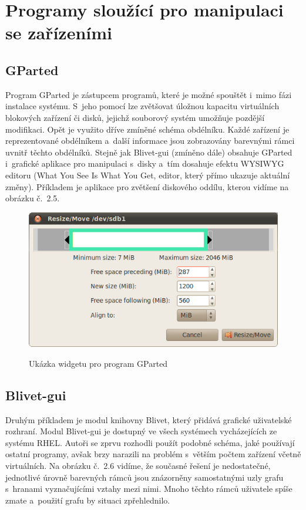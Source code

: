 \documentclass[printed,color,table,oneside,nolot,nolof]{fithesis}
\begin{document}
\pagebreak
\section{Programy sloužící pro manipulaci se zařízeními}

\subsection{GParted}
	Program GParted\cite{GParted} je zástupcem programů, které je možné spouštět i~mimo fázi instalace systému. S~jeho pomocí lze 
	zvětšovat úložnou kapacitu virtuálních blokových zařízení či disků, jejichž souborový systém umožňuje pozdější modifikaci. Opět je využito dříve zmíněné schéma obdélníku. Každé zařízení je reprezentované
	obdélníkem a~další informace jsou zobrazovány barevnými rámci uvnitř těchto obdélníků. Stejně jak Blivet-gui (zmíněno dále) obsahuje GParted i~grafické aplikace pro manipulaci s~disky 
	a~tím dosahuje efektu WYSIWYG editoru (What You See Is What You Get, editor, který přímo ukazuje aktuální změny). Příkladem je aplikace pro zvětšení diskového oddílu, kterou vidíme na obrázku č.~2.5.

 \begin{figure}[h!]
	 \label{fig:gparted}
	 \caption{Ukázka widgetu pro program GParted~\cite{GParted}}
	 \centering
	 \includegraphics[width=.8\columnwidth]{pictures/gparted-5-big.png}\\
 \end{figure}
 
 \pagebreak
 \subsection{Blivet-gui}

 Druhým příkladem je modul knihovny Blivet, který přidává grafické uživatelské rozhraní. Modul Blivet-gui je dostupný ve všech systémech vycházejících ze systému RHEL. Autoři 
 se zprvu rozhodli použít podobné schéma, jaké používají ostatní programy, avšak brzy narazili na problém s~větším počtem zařízení včetně virtuálních. Na obrázku č.~2.6 vidíme, že současné řešení je nedostatečné, jednotlivé úrovně 
 barevných rámců 
 jsou znázorněny samostatnými uzly grafu s~hranami vyznačujícími vztahy mezi nimi. Mnoho těchto rámců uživatele spíše zmate a~použití grafu by situaci zpřehlednilo.
\end{document}

